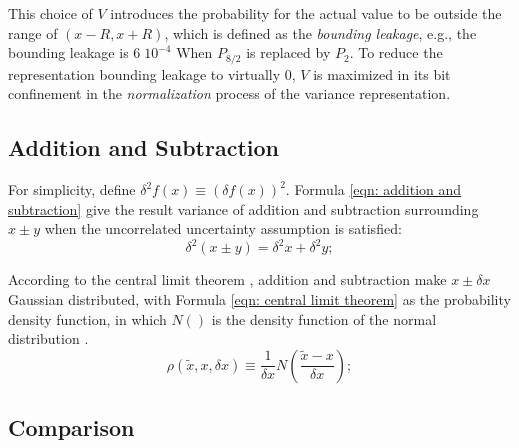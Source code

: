 \documentclass[twoside]{article}
\numberwithin{equation}{section}
\begin{document}
This choice of $V$ introduces the probability for the actual value to be outside the range of $(x - R, x + R)$, which is defined as the \emph{bounding leakage}, e.g., the bounding leakage is $6\;10^{-4}$ When $P_{8/2}$ is replaced by $P_2$.
To reduce the representation bounding leakage to virtually 0, $V$ is maximized in its bit confinement in the \emph{normalization} process of the variance representation.





\subsection{Addition and Subtraction}


For simplicity, define $\delta^2 f(x) \equiv (\delta f(x))^2$. 
Formula \eqref{eqn: addition and subtraction} give the result variance of addition and subtraction surrounding $x \pm y$ when the uncorrelated uncertainty assumption is satisfied:
\begin{equation}
\label{eqn: addition and subtraction}
\delta^2 (x \pm y) = \delta^2 x + \delta^2 y;
\end{equation}

According to the central limit theorem \cite{Probability_Statistics}, addition and subtraction make $x \pm \delta x$ Gaussian distributed, with Formula \eqref{eqn: central limit theorem} as the probability density function, in which $N()$ is the density function of the  normal distribution \cite{Probability_Statistics}. 
\begin{equation}
\label{eqn: central limit theorem}
\rho(\tilde{x}, x, \delta x) \equiv \frac{1}{\delta x} N(\frac{\tilde{x} - x}{\delta x});
\end{equation}



\subsection{Comparison}

\iffalse
\end{document}
